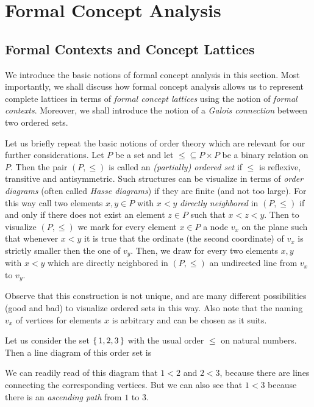 
\chapter{Formal Concept Analysis}
\label{cha:form-conc-analys}


\section{Formal Contexts and Concept Lattices}
\label{sec:form-cont-cont}

We introduce the basic notions of formal concept analysis in this section.  Most
importantly, we shall discuss how formal concept analysis allows us to represent
complete lattices in terms of \emph{formal concept lattices} using the notion of
\emph{formal contexts}.  Moreover, we shall introduce the notion of a \emph{Galois
  connection} between two ordered sets.

Let us briefly repeat the basic notions of order theory which are relevant for our further
considerations.  Let $P$ be a set and let ${\le} \subseteq P \times P$ be a binary
relation on $P$.  Then the pair $(P, \le)$ is called an \emph{(partially) ordered set} if
$\le$ is reflexive, transitive and antisymmetric.  Such structures can be visualize in
terms of \emph{order diagrams} (often called \emph{Hasse diagrams}) if they are finite
(and not too large).  For this way call two elements $x, y \in P$ with $x < y$
\emph{directly neighbored} in $(P, \le)$ if and only if there does not exist an element $z
\in P$ such that $x < z < y$.  Then to visualize $(P, \le)$ we mark for every element
$x \in P$ a node $v_x$ on the plane such that whenever $x < y$ it is true that the
ordinate (the second coordinate) of $v_x$ is strictly smaller then the one of $v_y$.
Then, we draw for every two elements $x, y$ with $x < y$ which are directly neighbored in
$(P, \le)$ an undirected line from $v_x$ to $v_y$.

Observe that this construction is not unique, and are many different possibilities (good
and bad) to visualize ordered sets in this way.  Also note that the naming $v_x$ of
vertices for elements $x$ is arbitrary and can be chosen as it suits.

\begin{Example}
  \label{expl:1}
  Let us consider the set ${\{\,1, 2, 3\,\}}$ with the usual order $\le$ on natural numbers.
  Then a line diagram of this order set is
  \begin{center}
  \end{center}
  We can readily read of this diagram that $1 < 2$ and $2 < 3$, because there are lines
  connecting the corresponding vertices.  But we can also see that $1 < 3$ because there
  is an \emph{ascending path} from $1$ to $3$.
\end{Example}


